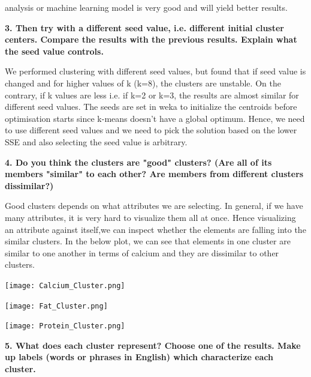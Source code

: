 \documentclass[a4paper,10pt]{article}
\begin{document}
analysis or machine learning model is very good and will yield better results. \par
\textbf{3. Then try with a different seed value, i.e. different initial cluster centers. Compare the results with the previous results. Explain what the seed value controls.} \par
We performed clustering with different seed values, but found that if seed value is changed and for higher values of k (k=8), the clusters are unstable.
On the contrary, if k values are less i.e. if k=2 or k=3, the results are almost similar for different seed values.
The seeds are set in weka to initialize the centroids before optimisation starts since k-means doesn't have a global optimum.
Hence, we need to use different seed values and we need to pick the solution based on the lower SSE and also selecting the seed value is arbitrary.
\par
\textbf{4. Do you think the clusters are "good" clusters? (Are all of its members "similar" to each other? Are members from different clusters dissimilar?)} \par
Good clusters depends on what attributes we are selecting. In general, if we have many attributes, it is very hard
to visualize them all at once. Hence visualizing an attribute against itself,we can inspect whether the elements
are falling into the similar clusters. In the below plot, we can see that elements in one cluster are similar to 
one another in terms of calcium and they are dissimilar to other clusters. 
\par
\begin{center}
  \texttt{[image: Calcium\_Cluster.png]}
\end{center}
\par
\begin{center}
  \texttt{[image: Fat\_Cluster.png]}
\end{center}
\par
\begin{center}
  \texttt{[image: Protein\_Cluster.png]}
\end{center}
\par
\textbf{5. What does each cluster represent? Choose one of the results. Make up labels (words or phrases in English) which characterize each cluster.} \par
\end{document}
